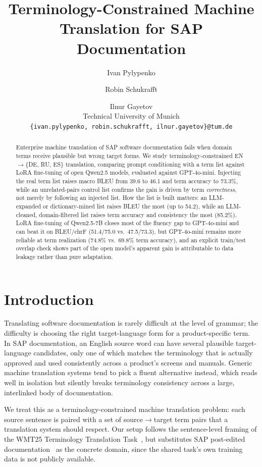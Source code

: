 \documentclass[11pt]{article}
\title{Terminology-Constrained Machine Translation for SAP Documentation}
\author{Ivan Pylypenko \and Robin Schukrafft \and Ilnur Gayetov \\
  Technical University of Munich \\
  \texttt{\{ivan.pylypenko, robin.schukrafft, ilnur.gayetov\}@tum.de}}
\begin{document}
\maketitle

\begin{abstract}
Enterprise machine translation of SAP software documentation fails when domain terms receive plausible but wrong target forms. We study terminology-constrained EN$\to$\{DE, RU, ES\} translation, comparing prompt conditioning with a term list against LoRA fine-tuning of open Qwen2.5 models, evaluated against GPT-4o-mini. Injecting the real term list raises macro BLEU from 39.6 to 46.1 and term accuracy to 73.3\%, while an unrelated-pairs control list confirms the gain is driven by term \emph{correctness}, not merely by following an injected list. How the list is built matters: an LLM-expanded or dictionary-mined list raises BLEU the most (up to 54.2), while an LLM-cleaned, domain-filtered list raises term accuracy and consistency the most (85.2\%). LoRA fine-tuning of Qwen2.5-7B closes most of the fluency gap to GPT-4o-mini and can beat it on BLEU/chrF (51.4/75.0 vs.\ 47.5/73.3), but GPT-4o-mini remains more reliable at term realization (74.8\% vs.\ 69.8\% term accuracy), and an explicit train/test overlap check shows part of the open model's apparent gain is attributable to data leakage rather than pure adaptation.
\end{abstract}

\section{Introduction}
\label{sec:introduction}

Translating software documentation is rarely difficult at the level of grammar; the difficulty is choosing the right target-language form for a product-specific term. In SAP documentation, an English source word can have several plausible target-language candidates, only one of which matches the terminology that is actually approved and used consistently across a product's screens and manuals. Generic machine translation systems tend to pick a fluent alternative instead, which reads well in isolation but silently breaks terminology consistency across a large, interlinked body of documentation.

We treat this as a terminology-constrained machine translation problem: each source sentence is paired with a set of source$\rightarrow$target term pairs that a translation system should respect. Our setup follows the sentence-level framing of the WMT25 Terminology Translation Task~\citep{semenov-etal-2025-wmt25}, but substitutes SAP post-edited documentation~\citep{sap2024termpostedits} as the concrete domain, since the shared task's own training data is not publicly available.
\end{document}
